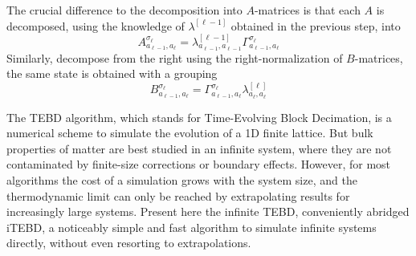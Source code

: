         The crucial difference to the decomposition into $A$-matrices is that each $A$ is decomposed, using the knowledge of $\lambda^{[\ell-1]}$ obtained in the previous step, into
        \begin{equation}
            A_{a_{\ell-1},a_{\ell}}^{\sigma_{\ell}}=\lambda_{a_{\ell-1},a_{\ell-1}}^{[\ell-1]}\Gamma_{a_{\ell-1},a_{\ell}}^{\sigma_{\ell}}
        \end{equation}
        Similarly, decompose from the right using the right-normalization of $B$-matrices, the same state is obtained with a grouping
        \begin{equation}
            B_{a_{\ell-1},a_{\ell}}^{\sigma_{\ell}}=\Gamma_{a_{\ell-1},a_{\ell}}^{\sigma_{\ell}}\lambda_{a_{\ell},a_{\ell}}^{[\ell]}
        \end{equation}

        The TEBD algorithm, which stands for Time-Evolving Block Decimation, is a numerical scheme to simulate the evolution of a 1D finite lattice. But bulk properties of matter are best studied in an infinite system, where they are not contaminated by finite-size corrections or boundary effects. However, for most algorithms the cost of a simulation grows with the system size, and the thermodynamic limit can only be reached by extrapolating results for increasingly large systems. Present here the infinite TEBD, conveniently abridged iTEBD, a noticeably simple and fast algorithm to simulate infinite systems directly, without even resorting to extrapolations.

